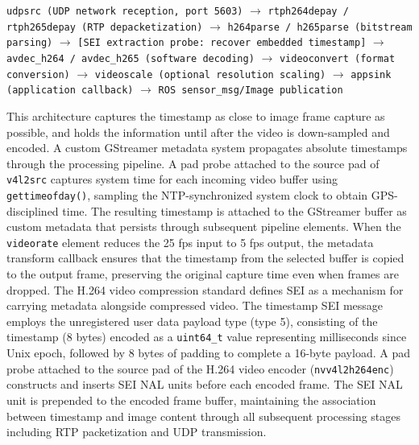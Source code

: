 \begin{algorithm}
\caption{Receive Pipeline (Atlas PC)}
\begin{algorithmic}[1]
\State \texttt{udpsrc (UDP network reception, port 5603)}
\State $\rightarrow$ \texttt{rtph264depay / rtph265depay (RTP depacketization)}
\State $\rightarrow$ \texttt{h264parse / h265parse (bitstream parsing)}
\State $\rightarrow$ \texttt{[SEI extraction probe: recover embedded timestamp]}
\State $\rightarrow$ \texttt{avdec\_h264 / avdec\_h265 (software decoding)}
\State $\rightarrow$ \texttt{videoconvert (format conversion)}
\State $\rightarrow$ \texttt{videoscale (optional resolution scaling)}
\State $\rightarrow$ \texttt{appsink (application callback)}
\State $\rightarrow$ \texttt{ROS sensor\_msg/Image publication}
\end{algorithmic} \label{video_decode}
\end{algorithm}

This architecture captures the timestamp as close to image frame capture as possible, and holds the information until after the video is down-sampled and encoded.
A custom GStreamer metadata system propagates absolute timestamps through the processing pipeline. A pad probe attached to the source pad of \texttt{v4l2src} captures system time for each incoming video buffer using \texttt{gettimeofday()}, sampling the \ac{NTP}-synchronized system clock to obtain GPS-disciplined time. The resulting timestamp is attached to the GStreamer buffer as custom metadata that persists through subsequent pipeline elements. When the \texttt{videorate} element reduces the 25 fps input to 5 fps output, the metadata transform callback ensures that the timestamp from the selected buffer is copied to the output frame, preserving the original capture time even when frames are dropped.
The H.264 video compression standard defines \ac{SEI} as a mechanism for carrying metadata alongside compressed video. 
The timestamp \ac{SEI} message employs the unregistered user data payload type (type 5), consisting of the timestamp (8 bytes) encoded as a \texttt{uint64\_t} value representing milliseconds since Unix epoch, followed by 8 bytes of padding to complete a 16-byte payload. 
A pad probe attached to the source pad of the H.264 video encoder (\texttt{nvv4l2h264enc}) constructs and inserts \ac{SEI} \ac{NAL} units before each encoded frame.  
The \ac{SEI} \ac{NAL} unit is prepended to the encoded frame buffer, maintaining the association between timestamp and image content through all subsequent processing stages including \ac{RTP} packetization and \ac{UDP} transmission.


